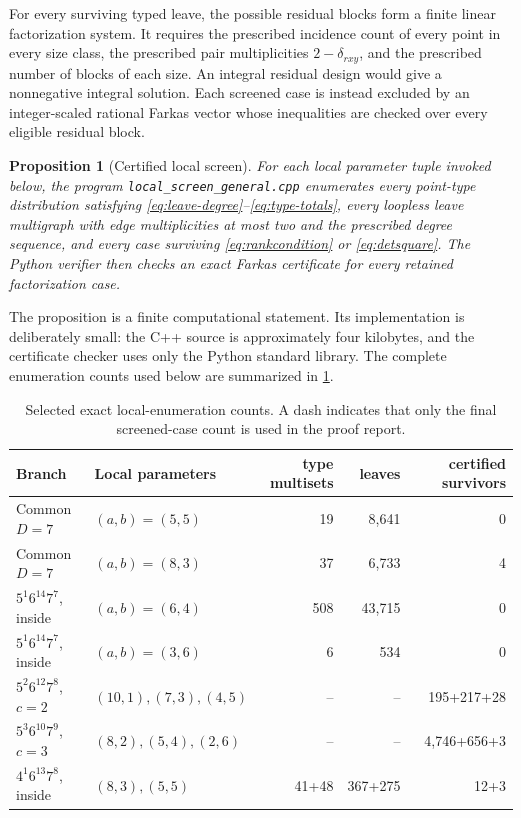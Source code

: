 \documentclass[10pt,a4paper]{amsart}
\newtheorem{proposition}[theorem]{Proposition}
\begin{document}
For every surviving typed leave, the possible residual blocks form a finite linear factorization system. It requires the prescribed incidence count of every point in every size class, the prescribed pair multiplicities $2-\delta_{rxy}$, and the prescribed number of blocks of each size. An integral residual design would give a nonnegative integral solution. Each screened case is instead excluded by an integer-scaled rational Farkas vector whose inequalities are checked over every eligible residual block.

\begin{proposition}[Certified local screen]\label{prop:localscreen}
For each local parameter tuple invoked below, the program \texttt{local\_screen\_general.cpp} enumerates every point-type distribution satisfying \eqref{eq:leave-degree}--\eqref{eq:type-totals}, every loopless leave multigraph with edge multiplicities at most two and the prescribed degree sequence, and every case surviving \eqref{eq:rankcondition} or \eqref{eq:detsquare}. The Python verifier then checks an exact Farkas certificate for every retained factorization case.
\end{proposition}

The proposition is a finite computational statement. Its implementation is deliberately small: the C++ source is approximately four kilobytes, and the certificate checker uses only the Python standard library. The complete enumeration counts used below are summarized in \cref{tab:localcounts}.

\begin{table}[ht]
\centering
\small
\begin{tabular}{@{}llrrr@{}}
\toprule
Branch & Local parameters & type multisets & leaves & certified survivors\\
\midrule
Common $D=7$ & $(a,b)=(5,5)$ & 19 & 8,641 & 0\\
Common $D=7$ & $(a,b)=(8,3)$ & 37 & 6,733 & 4\\
$5^1 6^{14}7^7$, inside & $(a,b)=(6,4)$ & 508 & 43,715 & 0\\
$5^1 6^{14}7^7$, inside & $(a,b)=(3,6)$ & 6 & 534 & 0\\
$5^2 6^{12}7^8$, $c=2$ & $(10,1),(7,3),(4,5)$ & -- & -- & 195+217+28\\
$5^3 6^{10}7^9$, $c=3$ & $(8,2),(5,4),(2,6)$ & -- & -- & 4,746+656+3\\
$4^1 6^{13}7^8$, inside & $(8,3),(5,5)$ & 41+48 & 367+275 & 12+3\\
\bottomrule
\end{tabular}
\caption{Selected exact local-enumeration counts. A dash indicates that only the final screened-case count is used in the proof report.}
\label{tab:localcounts}
\end{table}
\end{document}
